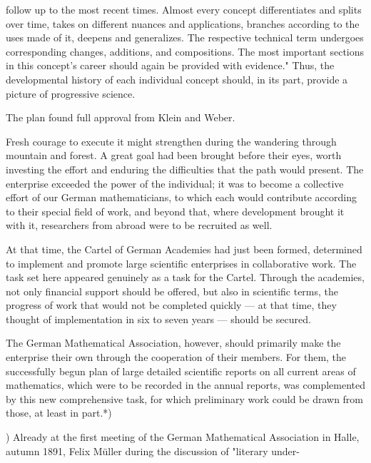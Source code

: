 \thispagestyle{fancy}

\vspace{0.5cm}

follow up to the most recent times. Almost every concept differentiates and splits over time, takes on different nuances and applications, branches according to the uses made of it, deepens and generalizes. The respective technical term undergoes corresponding changes, additions, and compositions. The most important sections in this concept's career should again be provided with evidence." Thus, the developmental history of each individual concept should, in its part, provide a picture of progressive science.

The plan found full approval from Klein and Weber.

Fresh courage to execute it might strengthen during the wandering through mountain and forest. A great goal had been brought before their eyes, worth investing the effort and enduring the difficulties that the path would present. The enterprise exceeded the power of the individual; it was to become a collective effort of our German mathematicians, to which each would contribute according to their special field of work, and beyond that, where development brought it with it, researchers from abroad were to be recruited as well.

At that time, the Cartel of German Academies had just been formed, determined to implement and promote large scientific enterprises in collaborative work. The task set here appeared genuinely as a task for the Cartel. Through the academies, not only financial support should be offered, but also in scientific terms, the progress of work that would not be completed quickly — at that time, they thought of implementation in six to seven years — should be secured.

The German Mathematical Association, however, should primarily make the enterprise their own through the cooperation of their members. For them, the successfully begun plan of large detailed scientific reports on all current areas of mathematics, which were to be recorded in the annual reports, was complemented by this new comprehensive task, for which preliminary work could be drawn from those, at least in part.*)

\vfill
\leftline{\rule{2in}{0.4pt}}
\vspace{0.2cm}
{\footnotesize *) Already at the first meeting of the German Mathematical Association in Halle, autumn 1891, Felix Müller during the discussion of "literary under-}
